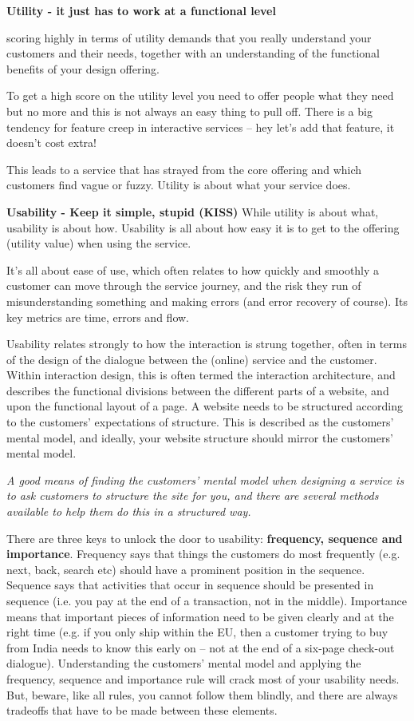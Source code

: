 \textbf{Utility - it just has to work at a functional level}

scoring highly in terms of utility demands that you really understand your customers and their needs, together with an understanding of the functional benefits of your design offering.

To get a high score on the utility level you need to offer people what they need but no more and this is not always an easy thing to pull off. There is a big tendency for feature creep in interactive services – hey let’s add that feature, it doesn’t cost extra!

This leads to a service that has strayed from the core offering and which customers find vague or fuzzy. Utility is about what your service does.

\textbf{Usability - Keep it simple, stupid (KISS)}
While utility is about what, usability is about how. Usability is all about how easy it is to get to the offering (utility value) when using the service.

It’s all about ease of use, which often relates to how quickly and smoothly a customer can move through the service journey, and the risk they run of misunderstanding something and making errors (and error recovery of course). Its key metrics are time, errors and flow.


Usability relates strongly to how the interaction is strung together, often in terms of the design of the dialogue between the (online) service and the customer. Within interaction design, this is often termed the interaction architecture, and describes the functional divisions between the different parts of a website, and upon the functional layout of a page. A website needs to be structured according to the customers’ expectations of structure. This is described as the customers’ mental model, and ideally, your website structure should mirror the customers’ mental model.

\textit{A good means of finding the customers’ mental model when designing a service is to ask customers to structure the site for you, and there are several methods available to help them do this in a structured way.}

There are three keys to unlock the door to usability: \textbf{frequency, sequence and importance}. Frequency says that things the customers do most frequently (e.g. next, back, search etc) should have a prominent position in the sequence. Sequence says that activities that occur in sequence should be presented in sequence (i.e. you pay at the end of a transaction, not in the middle). Importance means that important pieces of information need to be given clearly and at the right time (e.g. if you only ship within the EU, then a customer trying to buy from India needs to know this early on – not at the end of a six-page check-out dialogue). Understanding the customers’ mental model and applying the frequency, sequence and importance rule will crack most of your usability needs. But, beware, like all rules, you cannot follow them blindly, and there are always tradeoffs that have to be made between these elements.

